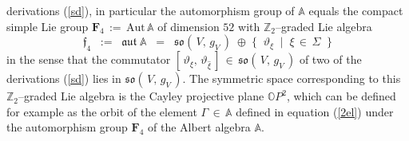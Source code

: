 \documentclass[12pt]{article}
\def\A{\mathbb{A}}
\def\Aut{\mathrm{Aut}}
\def\F{\mathbf{F}}
\def\O{\mathbb{O}}
\def\so{\mathfrak{so}}
\def\Z{\Sigma}
\begin{document}
 derivations (\ref{sd}), in particular the automorphism group of $\A$ equals
 the compact simple Lie group $\F_4\,:=\,\Aut\,\A$ of dimension $52$
 \cite{baez} with $\mathbb{Z}_2$--graded Lie algebra
 \begin{equation}\label{f4dec}
  \mathfrak{f}_4
  \;\;:=\;\;
  \mathfrak{aut}\;\A
  \;\;=\;\;
  \so(\,V,\,g_V\,)\;\oplus\;
  \{\;\;\vartheta_\xi\;\;|\;\;\xi\,\in\,\Z\;\;\}
 \end{equation}
 in the sense that the commutator $[\,\vartheta_\xi,\,\vartheta_{\hat\xi}\,]
 \,\in\,\so(\,V,\,g_V\,)$ of two of the derivations (\ref{sd}) lies in
 $\so(\,V,\,g_V\,)$. The symmetric space corresponding to this
 $\mathbb{Z}_2$--graded Lie algebra is the Cayley projective plane
 $\O P^2$, which can be defined for example as the orbit of the element
 $\Gamma\,\in\,\A$ defined in equation (\ref{2el}) under the automorphism
 group $\F_4$ of the Albert algebra $\A$.
 
\end{document}
